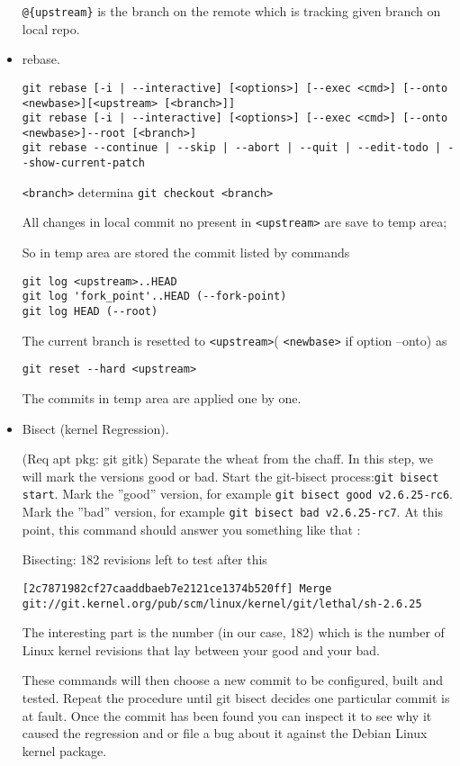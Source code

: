 \begin{itemize}
\verb=@{upstream}= is the branch on the remote which is tracking given branch on local repo.

\item rebase.

\begin{verbatim}
git rebase [-i | --interactive] [<options>] [--exec <cmd>] [--onto <newbase>][<upstream> [<branch>]]
git rebase [-i | --interactive] [<options>] [--exec <cmd>] [--onto <newbase>]--root [<branch>]
git rebase --continue | --skip | --abort | --quit | --edit-todo | --show-current-patch
\end{verbatim}

\verb=<branch>= determina \verb=git checkout <branch>=

All changes in local commit no present in \verb=<upstream>= are save to temp area;

So in temp area are stored the commit listed by commands
\begin{verbatim}
git log <upstream>..HEAD
git log 'fork_point'..HEAD (--fork-point)
git log HEAD (--root)
\end{verbatim}

The current branch is resetted to \verb=<upstream>=( \verb=<newbase>= if option --onto) as
\begin{verbatim}
git reset --hard <upstream>
\end{verbatim}

The commits in temp area are applied one by one.

\item Bisect (kernel Regression).

(Req apt pkg: git gitk)
Separate the wheat from the chaff. In this step, we will mark the versions good or bad.
Start the git-bisect process:\verb=git bisect start=.
Mark the ''good'' version, for example \verb=git bisect good v2.6.25-rc6=.
Mark the ''bad'' version, for example \verb=git bisect bad v2.6.25-rc7=.
At this point, this command should answer you something like that :

Bisecting: 182 revisions left to test after this
\begin{lstlisting}
[2c7871982cf27caaddbaeb7e2121ce1374b520ff] Merge git://git.kernel.org/pub/scm/linux/kernel/git/lethal/sh-2.6.25
\end{lstlisting}
The interesting part is the number (in our case, 182) which is the number of Linux kernel revisions that lay between your good and your bad.

These commands will then choose a new commit to be configured, built and tested. Repeat the procedure until git bisect decides one particular commit is at fault. Once the commit has been found you can inspect it to see why it caused the regression and or file a bug about it against the Debian Linux kernel package.

\end{itemize}

